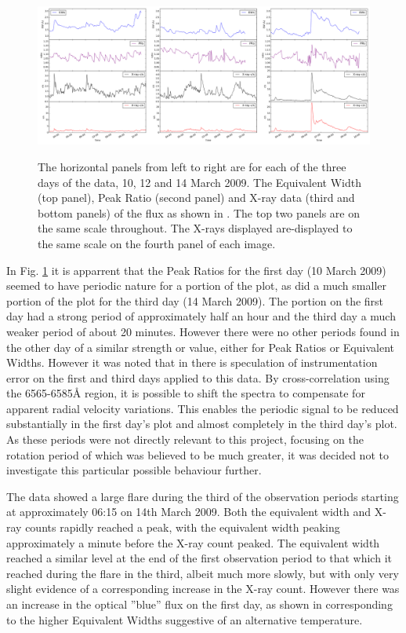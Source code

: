 \begin{figure}[!htbp]
\begin{center}
\includegraphics[scale=0.18]{Figures/uvrx-onepic.png} \\
\end{center}   
\caption{The horizontal panels from left to right are for each of the three days of the {\uves} data, 10, 12 and 14
  March 2009.  The Equivalent Width (top panel), Peak Ratio (second panel) and X-ray data (third and bottom panels) of the
  {\ha} flux as shown in \citet[Fig. 1 to Fig.3]{fuhrmeister11}. The top two panels are on the same scale
  throughout. The X-rays displayed are-displayed to the same scale on the fourth panel of each image.}
 \protect\label{fig:uvrxp1}
\end{figure}

In Fig. \ref{fig:uvrxp1} it is apparrent that the Peak Ratios for the first day (10 March 2009) seemed to have periodic
nature for a portion of the plot, as did a much smaller portion of the plot for the third day (14 March 2009). The
portion on the first day had a strong period of approximately half an hour and the third day a much weaker period of
about 20 minutes.  However there were no other periods found in the other day of a similar strength or value, either for
Peak Ratios or Equivalent Widths. However it was noted that in \citet[Section 4.1]{barnes14} there is speculation of
instrumentation error on the first and third days applied to this data. By cross-correlation using the 6565-6585{\AA}
region, it is possible to shift the spectra to compensate for apparent radial velocity variations. This enables the
periodic signal to be reduced substantially in the first day's plot and almost completely in the third day's plot. As
these periods were not directly relevant to this project, focusing on the rotation period of {\prox} which was believed
to be much greater, it was decided not to investigate this particular possible behaviour further.

The {\uves} data showed a large flare during the third of the observation periods starting at approximately 06:15 on
14th March 2009. Both the equivalent width and X-ray counts rapidly reached a peak, with the equivalent width peaking
approximately a minute before the X-ray count peaked. The equivalent width reached a similar level at the end of the
first observation period to that which it reached during the flare in the third, albeit much more slowly, but with only
very slight evidence of a corresponding increase in the X-ray count. However there was an increase in the {\uves}
optical ''blue'' flux on the first day, as shown in \citet[fig. 1]{fuhrmeister11} corresponding to the higher Equivalent
Widths suggestive of an alternative temperature.

